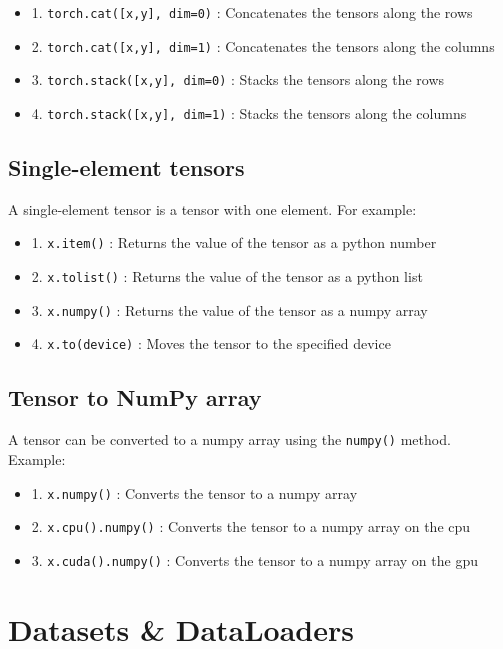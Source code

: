 \documentclass{article}
\begin{document}
\begin{itemize}
    \item 1. \texttt{torch.cat([x,y], dim=0)} : Concatenates the tensors along the rows
    \item 2. \texttt{torch.cat([x,y], dim=1)} : Concatenates the tensors along the columns
    \item 3. \texttt{torch.stack([x,y], dim=0)} : Stacks the tensors along the rows
    \item 4. \texttt{torch.stack([x,y], dim=1)} : Stacks the tensors along the columns
\end{itemize}

\subsection{Single-element tensors}

A single-element tensor is a tensor with one element. For example:

\begin{itemize}
    \item 1. \texttt{x.item()} : Returns the value of the tensor as a python number
    \item 2. \texttt{x.tolist()} : Returns the value of the tensor as a python list
    \item 3. \texttt{x.numpy()} : Returns the value of the tensor as a numpy array
    \item 4. \texttt{x.to(device)} : Moves the tensor to the specified device
\end{itemize}

\subsection{Tensor to NumPy array}

A tensor can be converted to a numpy array using the \texttt{numpy()} method. Example:

\begin{itemize}
    \item 1. \texttt{x.numpy()} : Converts the tensor to a numpy array
    \item 2. \texttt{x.cpu().numpy()} : Converts the tensor to a numpy array on the cpu
    \item 3. \texttt{x.cuda().numpy()} : Converts the tensor to a numpy array on the gpu
\end{itemize}

\section{Datasets \& DataLoaders}
\end{document}
